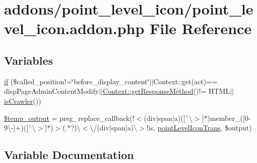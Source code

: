 \hypertarget{point__level__icon_8addon_8php}{}\section{addons/point\+\_\+level\+\_\+icon/point\+\_\+level\+\_\+icon.addon.\+php File Reference}
\label{point__level__icon_8addon_8php}
\subsection*{Variables}
\begin{DoxyCompactItemize}
\item 
\hyperlink{point__level__icon_8addon_8php_a29031816e50a8f742422e671b2bef9b2}{if} (\$called\+\_\+position!=\char`\"{}before\+\_\+display\+\_\+content\char`\"{}$\vert$$\vert$Context\+::get(\textquotesingle{}act\textquotesingle{})== \textquotesingle{}disp\+Page\+Admin\+Content\+Modify\textquotesingle{}$\vert$$\vert$\hyperlink{classContext_a1d02a15209360034cd719d8b08cb5061}{Context\+::get\+Response\+Method}()!= \textquotesingle{}H\+T\+M\+L\textquotesingle{}$\vert$$\vert$\hyperlink{func_8inc_8php_a490ffbd4821da1995c76c381553d5b3d}{is\+Crawler}())
\item 
\hyperlink{point__level__icon_8addon_8php_a5866ef6f77cbeaf87d8208cf805bbc3d}{\$temp\+\_\+output} = preg\+\_\+replace\+\_\+callback(\textquotesingle{}!$<$(div$\vert$span$\vert$a)(\mbox{[}$^\wedge$\textbackslash{}$>$\mbox{]}$\ast$)member\+\_\+(\mbox{[}0-\/9\textbackslash{}-\/\mbox{]}+)(\mbox{[}$^\wedge$\textbackslash{}$>$\mbox{]}$\ast$)$>$(.$\ast$?)\textbackslash{}$<$\textbackslash{}/(div$\vert$span$\vert$a)\textbackslash{}$>$!is\textquotesingle{}, \textquotesingle{}\hyperlink{point__level__icon_8lib_8php_a6581bcaf11de4c31924e7a5de3d6887d}{point\+Level\+Icon\+Trans}\textquotesingle{}, \$output)
\end{DoxyCompactItemize}


\subsection{Variable Documentation}
\hypertarget{point__level__icon_8addon_8php_a5866ef6f77cbeaf87d8208cf805bbc3d}{}
